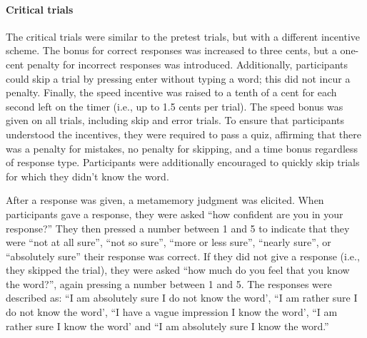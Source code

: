 \paragraph{Critical trials} The critical trials were similar to the pretest trials, but with a different incentive scheme. The bonus for correct responses was increased to three cents, but a one-cent penalty for incorrect responses was introduced. Additionally, participants could skip a trial by pressing enter without typing a word; this did not incur a penalty. Finally, the speed incentive was raised to a tenth of a cent for each second left on the timer (i.e., up to 1.5 cents per trial). The speed bonus was given on all trials, including skip and error trials. To ensure that participants understood the incentives, they were required to pass a quiz, affirming that there was a penalty for mistakes, no penalty for skipping, and a time bonus regardless of response type. Participants were additionally encouraged to quickly skip trials for which they didn't know the word.

After a response was given, a metamemory judgment was elicited. When participants gave a response, they were asked ``how confident are you in your response?'' They then pressed a number between 1 and 5 to indicate that they were ``not at all sure'', ``not so sure'', ``more or less sure'', ``nearly sure'', or ``absolutely sure'' their response was correct. If they did not give a response (i.e., they skipped the trial), they were asked ``how much do you feel that you know the word?'', again pressing a number between 1 and 5. The responses were described as: ``I am absolutely sure I do not know the word', ``I am rather sure I do not know the word', ``I have a vague impression I know the word', ``I am rather sure I know the word' and ``I am absolutely sure I know the word.'' 

